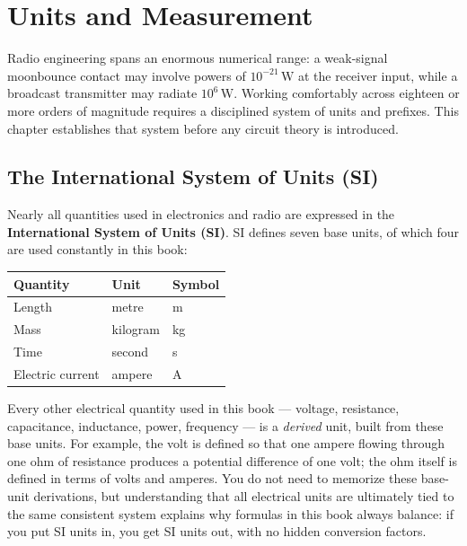 \chapter{Units and Measurement}
\label{ch:units}

Radio engineering spans an enormous numerical range: a weak-signal
moonbounce contact may involve powers of $10^{-21}\,\text{W}$ at the
receiver input, while a broadcast transmitter may radiate $10^{6}\,\text{W}$.
Working comfortably across eighteen or more orders of magnitude requires a
disciplined system of units and prefixes. This chapter establishes that
system before any circuit theory is introduced.

\section{The International System of Units (SI)}

Nearly all quantities used in electronics and radio are expressed in the
\textbf{International System of Units (SI)}. SI defines seven base units,
of which four are used constantly in this book:

\begin{center}
\begin{tabular}{@{}lll@{}}
\toprule
Quantity & Unit & Symbol \\
\midrule
Length & metre & m \\
Mass & kilogram & kg \\
Time & second & s \\
Electric current & ampere & A \\
\bottomrule
\end{tabular}
\end{center}

Every other electrical quantity used in this book --- voltage, resistance,
capacitance, inductance, power, frequency --- is a \emph{derived} unit,
built from these base units. For example, the volt is defined so that one
ampere flowing through one ohm of resistance produces a potential
difference of one volt; the ohm itself is defined in terms of volts and
amperes. You do not need to memorize these base-unit derivations, but
understanding that all electrical units are ultimately tied to the same
consistent system explains why formulas in this book always balance: if
you put SI units in, you get SI units out, with no hidden conversion
factors.

